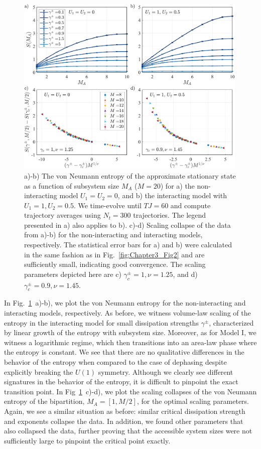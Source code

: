 \begin{figure}[hbt!]
    \centering
    \includegraphics[width=0.99\textwidth]{Chapters/Plots/Chapter4/Chapter3_Fig7.pdf}
    \caption{a)-b) The von Neumann entropy of the approximate stationary state as a function of subsystem size $M_A$ ($M=20$) for a) the non-interacting model $U_1 = U_2 = 0$, and b) the interacting model with $U_1 = 1, U_2 = 0.5$. We time-evolve until $TJ = 60$ and compute trajectory averages using $N_t = 300$ trajectories. The legend presented in a) also applies to b). c)-d) Scaling collapse of the data from a)-b) for the non-interacting and interacting models, respectively. The statistical error bars for a) and b) were calculated in the same fashion as in Fig.~\ref{fig:Chapter3_Fig2} and are sufficiently small, indicating good convergence. The scaling parameters depicted here are c) $\gamma^\pm_c = 1, \nu = 1.25$, and d) $\gamma^\pm_c = 0.9, \nu = 1.45$.}
    \label{fig:Chapter3_Fig7}
\end{figure}

In Fig.~\ref{fig:Chapter3_Fig7}~a)-b), we plot the von Neumann entropy for the non-interacting and interacting models, respectively. As before, we witness volume-law scaling of the entropy in the interacting model for small dissipation strengths $\gamma^\pm$, characterized by linear growth of the entropy with subsystem size. Moreover, as for Model I, we witness a logarithmic regime, which then transitions into an area-law phase where the entropy is constant. We see that there are no qualitative differences in the behavior of the entropy when compared to the case of dephasing despite explicitly breaking the $U(1)$ symmetry. Although we clearly see different signatures in the behavior of the entropy, it is difficult to pinpoint the exact transition point. In Fig~\ref{fig:Chapter3_Fig7}~c)-d), we plot the scaling collapses of the von Neumann entropy of the bipartition, $M_A = [1, M/2]$, for the optimal scaling parameters. Again, we see a similar situation as before: similar critical dissipation strength and exponents collapse the data. In addition, we found other parameters that also collapsed the data, further proving that the accessible system sizes were not sufficiently large to pinpoint the critical point exactly. 

